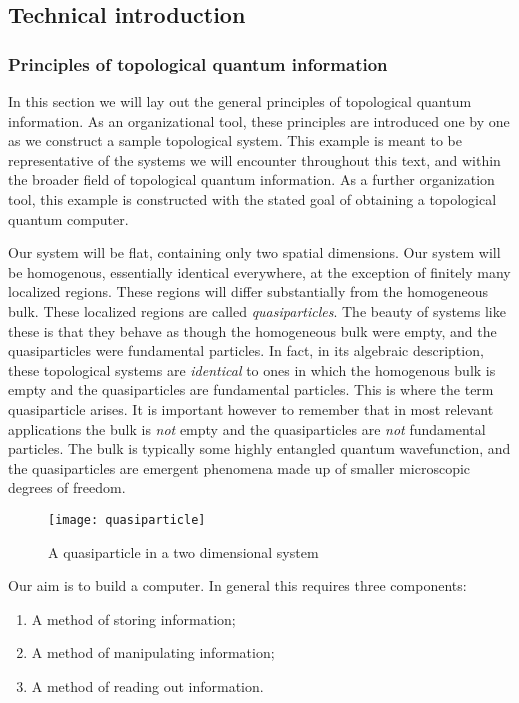 \subsection{Technical introduction}
\label{technical introduction}

\subsubsection{Principles of topological quantum information}

In this section we will lay out the general principles of topological quantum information. As an organizational tool, these principles are introduced one by one as we construct a sample topological system. This example is meant to be representative of the systems we will encounter throughout this text, and within the broader field of topological quantum information. As a further organization tool, this example is constructed with the stated goal of obtaining a topological quantum computer.

Our system will be flat, containing only two spatial dimensions. Our system will be homogenous, essentially identical everywhere, at the exception of finitely many localized regions. These regions will differ substantially from the homogeneous bulk. These localized regions are called \textit{quasiparticles}. The beauty of systems like these is that they behave as though the homogeneous bulk were empty, and the quasiparticles were fundamental particles. In fact, in its algebraic description, these topological systems are \textit{identical} to ones in which the homogenous bulk is empty and the quasiparticles are fundamental particles. This is where the term quasiparticle arises. It is important however to remember that in most relevant applications the bulk is \textit{not} empty and the quasiparticles are \textit{not} fundamental particles. The bulk is typically some highly entangled quantum wavefunction, and the quasiparticles are emergent phenomena made up of smaller microscopic degrees of freedom.

\begin{figure}[h]
\begin{center}
\texttt{[image: quasiparticle]}
\end{center}
\caption{A quasiparticle in a two dimensional system}
\end{figure}

Our aim is to build a computer. In general this requires three components:

\begin{enumerate}
\item A method of storing information;
\item A method of manipulating information;
\item A method of reading out information.
\end{enumerate}

